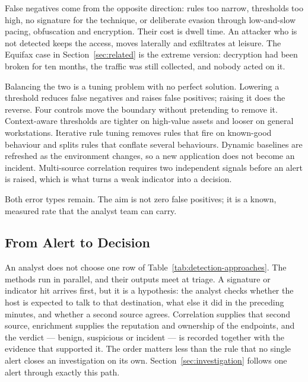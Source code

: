 False negatives come from the opposite direction: rules too narrow, thresholds too high, no signature for the technique, or deliberate evasion through low-and-slow pacing, obfuscation and encryption. Their cost is dwell time. An attacker who is not detected keeps the access, moves laterally and exfiltrates at leisure. The Equifax case in Section~\ref{sec:related} is the extreme version: decryption had been broken for ten months, the traffic was still collected, and nobody acted on it.

Balancing the two is a tuning problem with no perfect solution. Lowering a threshold reduces false negatives and raises false positives; raising it does the reverse. Four controls move the boundary without pretending to remove it. Context-aware thresholds are tighter on high-value assets and looser on general workstations. Iterative rule tuning removes rules that fire on known-good behaviour and splits rules that conflate several behaviours. Dynamic baselines are refreshed as the environment changes, so a new application does not become an incident. Multi-source correlation requires two independent signals before an alert is raised, which is what turns a weak indicator into a decision.

Both error types remain. The aim is not zero false positives; it is a known, measured rate that the analyst team can carry.

\subsection{From Alert to Decision}
\label{sec:alert-to-decision}

An analyst does not choose one row of Table~\ref{tab:detection-approaches}. The methods run in parallel, and their outputs meet at triage. A signature or indicator hit arrives first, but it is a hypothesis: the analyst checks whether the host is expected to talk to that destination, what else it did in the preceding minutes, and whether a second source agrees. Correlation supplies that second source, enrichment supplies the reputation and ownership of the endpoints, and the verdict --- benign, suspicious or incident --- is recorded together with the evidence that supported it. The order matters less than the rule that no single alert closes an investigation on its own. Section~\ref{sec:investigation} follows one alert through exactly this path.
